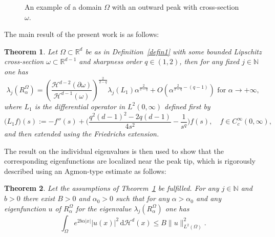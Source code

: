 \documentclass[11pt,oneside,reqno,a4paper]{amsart}
\newcommand{\dd}{\mathrm{d}}
\newcommand{\N}{\mathbb{N}}
\newcommand{\R}{\mathbb{R}}
\renewcommand{\H}{\mathcal{H}}
\newtheorem{theorem}{Theorem}
\theoremstyle{definition}
\begin{document}
\begin{figure}
{
	}
	
	
	
	\caption{An example of a domain $\Omega$ with an outward peak with cross-section $\omega$.}\label{fig1}
\end{figure}

The main result of the present work is as follows:
\begin{theorem}\label{thmain}
Let $\Omega\subset\R^d$	be as in Definition~\ref{defin1} with some bounded Lipschitz cross-section $\omega\subset\R^{d-1}$ and sharpness order $q\in(1,2)$, then for any fixed $j\in\N$ one has
	\begin{equation}
		 \label{ljj}
	\lambda_j(R^\Omega_\alpha)=\left(\dfrac{\H^{d-2}(\partial\omega)}{\H^{d-1}(\omega)}\right)^\frac{2}{2-q} \lambda_j(L_1)\alpha^{\frac{2}{2-q}} +O\left(\alpha^{\frac{2}{2-q}-(q-1)}\right) \text{ for }\alpha\to +\infty,
	\end{equation}
where $L_1$ is the differential operator in $L^2(0,\infty)$ defined first by
\[
\big(L_1 f\big)(s):=-f''(s)+\bigg(\dfrac{q^2(d-1)^2-2q(d-1)}{4s^2}-\dfrac{1}{s^q}\bigg)f(s),
\quad f\in C^\infty_c(0,\infty),
\]	
and then extended using the Friedrichs extension.	
\end{theorem}

The result on the individual eigenvalues is then used to show that the corresponding eigenfunctions are localized
near the peak tip, which is rigorously described using an Agmon-type estimate as follows:
\begin{theorem}\label{thmeig}
	Let the assumptions of Theorem~\ref{thmain} be fulfilled. For any $j\in\N$ and $b>0$ there exist $B>0$ and $\alpha_0>0$ such that
	for any $\alpha>\alpha_0$ and any eigenfunction $u$ of $R_\alpha^\Omega$ for the eigenvalue $\lambda_j(R_\alpha^\Omega)$
	one has
	\begin{equation}
		\label{agm0}
		\int_{\Omega}e^{2b\alpha|x|}\big|u(x)\big|^2\, \dd \H^d(x)\le B\|u\|^{2}_{L^2(\Omega)}.
	\end{equation}
\end{theorem}
\end{document}
